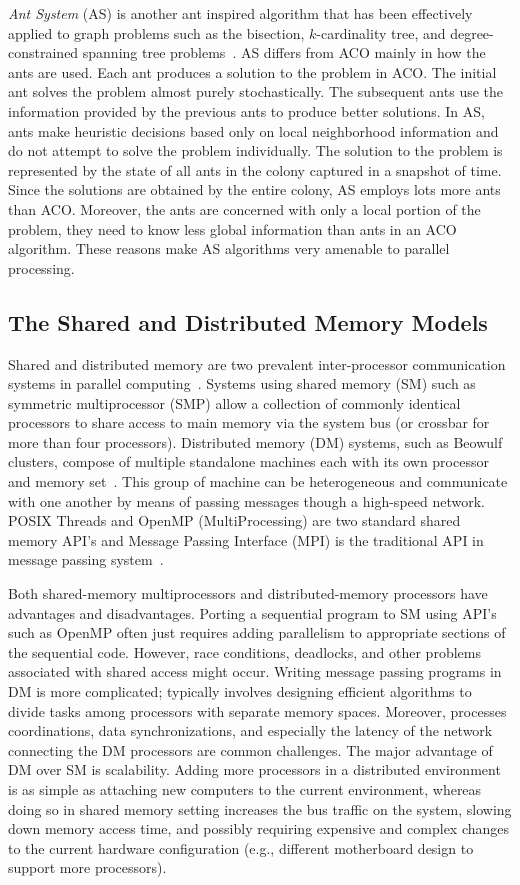 \documentclass[11pt]{article}
\begin{document}
\textit{Ant System} (AS) is another ant inspired algorithm that has been effectively applied to graph problems such as the bisection, $k$-cardinality tree, and degree-constrained spanning tree problems~\cite{BS2, BS1, BZ}.  AS differs from ACO mainly in how the ants are used. Each ant produces a solution to the problem in ACO. The initial ant solves the problem almost purely stochastically. The subsequent ants use the information provided by the previous ants to produce better solutions. In AS, ants make heuristic decisions based only on local neighborhood information and do not attempt to solve the problem individually. The solution to the problem is represented by the state of all ants in the colony captured in a snapshot of time. Since the solutions are obtained by the entire colony, AS employs lots more ants than ACO.  Moreover, the ants are concerned with only a local portion of the problem, they need to know less global information than ants in an ACO algorithm. These reasons make AS algorithms very amenable to parallel processing. 


\subsection{The Shared and Distributed Memory Models}


Shared and distributed memory are two prevalent inter-processor communication systems in parallel computing~\cite{PH}. Systems using shared memory (SM) such as symmetric multiprocessor (SMP) allow a collection of commonly identical processors to share access to main memory via the system bus (or crossbar for more than four processors).  Distributed memory (DM) systems, such as Beowulf clusters, compose of multiple standalone machines each with its own processor and memory set~\cite{cluster}. This group of machine can be heterogeneous and communicate with one another by means of passing messages though a high-speed network.  POSIX Threads and OpenMP (MultiProcessing) are two standard shared memory API's and Message Passing Interface (MPI) is the traditional API in message passing system~\cite{MPI,OpenMP}.

Both shared-memory multiprocessors and distributed-memory processors have advantages and disadvantages. Porting a sequential program to SM using API's such as OpenMP often just requires adding parallelism to appropriate sections of the sequential code.  However, race conditions, deadlocks, and other problems associated with shared access might occur.  Writing message passing programs in DM is more complicated; typically involves designing efficient algorithms to divide tasks among processors with separate memory spaces.  Moreover, processes coordinations, data synchronizations, and especially the latency of the network connecting the DM processors are common challenges.  The major advantage of DM over SM is scalability.  Adding more processors in a distributed environment is as simple as attaching new computers to the current environment, whereas doing so in shared memory setting increases the bus traffic on the system, slowing down memory access time, and possibly requiring expensive and complex changes to the current hardware configuration (e.g., different motherboard design to support more processors).
\end{document}
